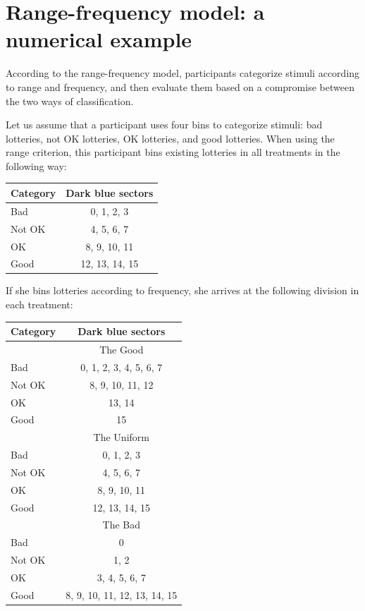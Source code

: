 \newpage
\section{Range-frequency model: a numerical example}
\label{section:appendixb}
\setcounter{figure}{0}
\setcounter{table}{0}
\renewcommand{\thefigure}{B.\arabic{figure}}
\renewcommand{\thetable}{B.\arabic{table}}
According to the range-frequency model, participants categorize stimuli according to range and frequency, and then evaluate them based on a compromise between the two ways of classification.

Let us assume that a participant uses four bins to categorize stimuli: bad lotteries, not OK lotteries, OK lotteries, and good lotteries.
When using the range criterion, this participant bins existing lotteries in all treatments in the following way:
\begin{center}
\begin{tabular}{p{3cm} c}
Category & Dark blue sectors \\
\hline
Bad & 0, 1, 2, 3\\
Not OK & 4, 5, 6, 7\\
OK & 8, 9, 10, 11\\
Good & 12, 13, 14, 15\\
\hline
\end{tabular}
\end{center}

If she bins lotteries according to frequency, she arrives at the following division in each treatment:
\begin{center}
\begin{tabular}{p{3cm} c}
Category & Dark blue sectors \\
\hline
& The Good \\
\cmidrule{2-2}
Bad & 0, 1, 2, 3, 4, 5, 6, 7\\
Not OK & 8, 9, 10, 11, 12\\
OK & 13, 14\\
Good & 15\\
\cmidrule{2-2}
& The Uniform \\
\cmidrule{2-2}
Bad & 0, 1, 2, 3\\
Not OK & 4, 5, 6, 7\\
OK & 8, 9, 10, 11\\
Good & 12, 13, 14, 15\\
\cmidrule{2-2}
& The Bad \\
\cmidrule{2-2}
Bad & 0\\
Not OK & 1, 2\\
OK & 3, 4, 5, 6, 7\\
Good & 8, 9, 10, 11, 12, 13, 14, 15\\
\hline
\end{tabular}
\end{center}

